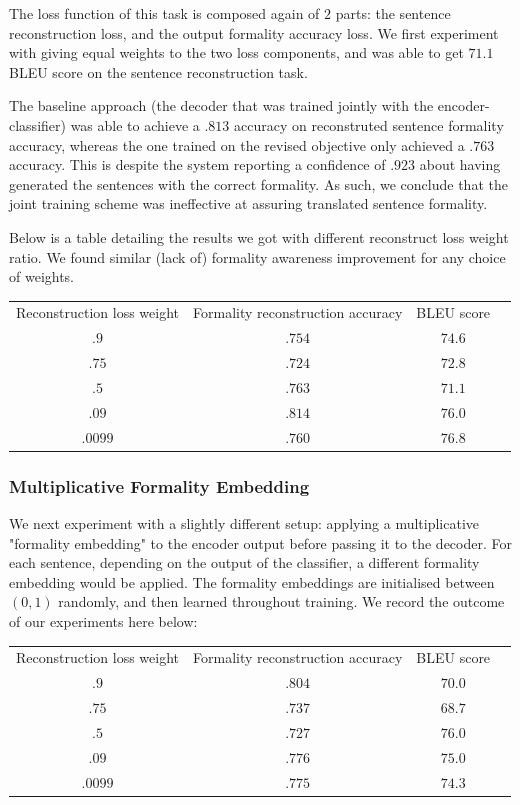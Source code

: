 \documentclass[11pt]{article}
\begin{document}
The loss function of this task is composed again of $2$ parts: the sentence reconstruction loss, and the output formality accuracy loss. We first experiment with giving equal weights to the two loss components, and was able to get $71.1$ BLEU score on the sentence reconstruction task.

The baseline approach (the decoder that was trained jointly with the encoder-classifier) was able to achieve a $.813$ accuracy on reconstruted sentence formality accuracy, whereas the one trained on the revised objective only achieved a $.763$ accuracy. This is despite the system reporting a confidence of $.923$ about having generated the sentences with the correct formality. As such, we conclude that the joint training scheme was ineffective at assuring translated sentence formality.  

Below is a table detailing the results we got with different reconstruct loss weight ratio. We found similar (lack of) formality awareness improvement for any choice of weights. 

\begin{tabular}{ c c c c }
    Reconstruction loss weight & Formality reconstruction accuracy & BLEU score \\
    $.9$ & $.754$ & $74.6$ \\
    $.75$ & $.724$ & $72.8$ \\
    $.5$ & $.763$ & $71.1$ \\
    $.09$ & $.814$ & $76.0$ \\
    $.0099$ & $.760$ & $76.8$ \\
\end{tabular}

\subsubsection{Multiplicative Formality Embedding}

We next experiment with a slightly different setup: applying a multiplicative "formality embedding" to the encoder output before passing it to the decoder. For each sentence, depending on the output of the classifier, a different formality embedding would be applied. The formality embeddings are initialised between $(0, 1)$ randomly, and then learned throughout training. We record the outcome of our experiments here below:

\begin{tabular}{ c c c c }
    Reconstruction loss weight & Formality reconstruction accuracy & BLEU score \\
    $.9$ & $.804$ & $70.0$ \\
    $.75$ & $.737$ & $68.7$ \\
    $.5$ & $.727$ & $76.0$ \\
    $.09$ & $.776$ & $75.0$ \\
    $.0099$ & $.775$ & $74.3$ \\
\end{tabular}
\end{document}
